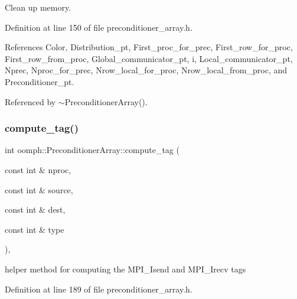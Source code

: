 Clean up memory. 



Definition at line 150 of file preconditioner\+\_\+array.\+h.



References Color, Distribution\+\_\+pt, First\+\_\+proc\+\_\+for\+\_\+prec, First\+\_\+row\+\_\+for\+\_\+proc, First\+\_\+row\+\_\+from\+\_\+proc, Global\+\_\+communicator\+\_\+pt, i, Local\+\_\+communicator\+\_\+pt, Nprec, Nproc\+\_\+for\+\_\+prec, Nrow\+\_\+local\+\_\+for\+\_\+proc, Nrow\+\_\+local\+\_\+from\+\_\+proc, and Preconditioner\+\_\+pt.



Referenced by $\sim$\+Preconditioner\+Array().

\mbox{\label{classoomph_1_1PreconditionerArray_a6a265f95d2cbb2fe10b9d08595fe7faf}} 
\subsubsection{\texorpdfstring{compute\+\_\+tag()}{compute\_tag()}}
{\footnotesize\ttfamily int oomph\+::\+Preconditioner\+Array\+::compute\+\_\+tag (\begin{DoxyParamCaption}\item[{const int \&}]{nproc,  }\item[{const int \&}]{source,  }\item[{const int \&}]{dest,  }\item[{const int \&}]{type }\end{DoxyParamCaption})\hspace{0.3cm}{\ttfamily [inline]}, {\ttfamily [private]}}



helper method for computing the M\+P\+I\+\_\+\+Isend and M\+P\+I\+\_\+\+Irecv tags 



Definition at line 189 of file preconditioner\+\_\+array.\+h.

\mbox{\label{classoomph_1_1PreconditionerArray_a73db1b394930346aa2d8d2902cca12e6}} 
